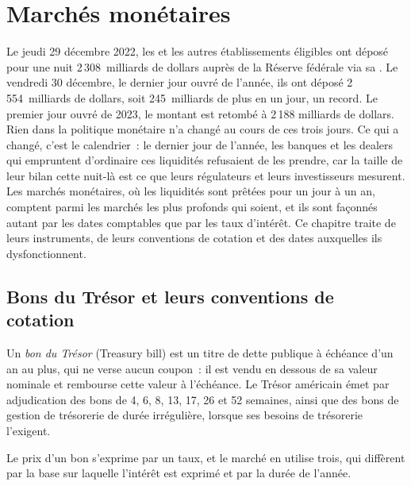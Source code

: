 \chapter{Marchés monétaires}\label{ch:m2:money-markets}

Le jeudi 29 décembre 2022, les  et les autres
établissements éligibles ont déposé pour une nuit 2\,308~milliards de dollars auprès de la Réserve fédérale
via sa . Le vendredi 30 décembre, le dernier jour ouvré
de l'année, ils ont déposé 2\,554~milliards de dollars, soit 245~milliards de plus
en un jour, un record. Le premier jour ouvré de 2023, le montant est retombé à 2\,188
milliards de dollars. Rien dans la politique monétaire n'a changé au cours de ces trois jours. Ce qui
a changé, c'est le calendrier~: le dernier jour de l'année, les banques et les dealers
qui empruntent d'ordinaire ces liquidités refusaient de les prendre, car la taille de leur
bilan cette nuit-là est ce que leurs régulateurs et leurs investisseurs
mesurent. Les marchés monétaires, où les liquidités sont prêtées pour un jour à un an, comptent
parmi les marchés les plus profonds qui soient, et ils sont façonnés autant par les dates
comptables que par les taux d'intérêt. Ce chapitre traite de leurs instruments, de leurs
conventions de cotation et des dates auxquelles ils dysfonctionnent.

\section{Bons du Trésor et leurs conventions de cotation}

\begin{definition}\label{def:m2:money-markets:bill}
Un \emph{bon du Trésor} (Treasury bill) est un titre de dette publique
à échéance d'un an au plus, qui ne verse aucun coupon~: il est vendu en dessous de sa
valeur nominale et rembourse cette valeur à l'échéance. Le Trésor américain émet par adjudication des bons
de 4, 6, 8, 13, 17, 26 et 52 semaines, ainsi que des bons de gestion de trésorerie de durée
irrégulière, lorsque ses besoins de trésorerie l'exigent.
\end{definition}

Le prix d'un bon s'exprime par un taux, et le marché en utilise trois, qui
diffèrent par la base sur laquelle l'intérêt est exprimé et par la durée de l'année.

